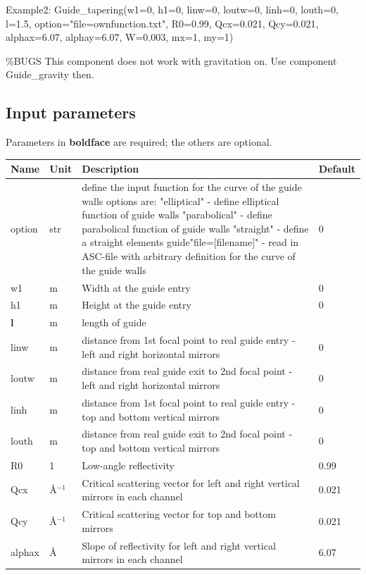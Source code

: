 Example2: Guide\_tapering(w1=0, h1=0, linw=0, loutw=0, linh=0, louth=0, l=1.5, option="file=ownfunction.txt", R0=0.99, Qcx=0.021, Qcy=0.021, alphax=6.07, alphay=6.07, W=0.003, mx=1, my=1)

\%BUGS This component does not work with gravitation on. Use component Guide\_gravity then.

\subsection*{Input parameters}
Parameters in \textbf{boldface} are required; the others are optional.

\begin{longtable}{p{}p{}p{}p{}}
\toprule
\textbf{Name} & \textbf{Unit} & \textbf{Description} & \textbf{Default} \\
\midrule
\endhead
option & str & define the input function for the curve of the guide walls options are: "elliptical" - define elliptical function of guide walls "parabolical" - define parabolical function of guide walls "straight"    - define a straight elements guide"file=[filename]" - read in ASC-file with arbitrary definition for the curve of the guide walls & 0 \\
w1 & m & Width at the guide entry & 0 \\
h1 & m & Height at the guide entry & 0 \\
\textbf{l} & m & length of guide &  \\
linw & m & distance from 1st focal point to real guide entry - left and right horizontal mirrors & 0 \\
loutw & m & distance from real guide exit to 2nd focal point - left and right horizontal mirrors & 0 \\
linh & m & distance from 1st focal point to real guide entry - top and bottom vertical mirrors & 0 \\
louth & m & distance from real guide exit to 2nd focal point - top and bottom vertical mirrors & 0 \\
R0 & 1 & Low-angle reflectivity & 0.99 \\
Qcx & \AA{}$^{-1}$ & Critical scattering vector for left and right vertical mirrors in each channel & 0.021 \\
Qcy & \AA{}$^{-1}$ & Critical scattering vector for top and bottom mirrors & 0.021 \\
alphax & \AA{} & Slope of reflectivity for left and right vertical mirrors in each channel & 6.07 \\

\end{longtable}
